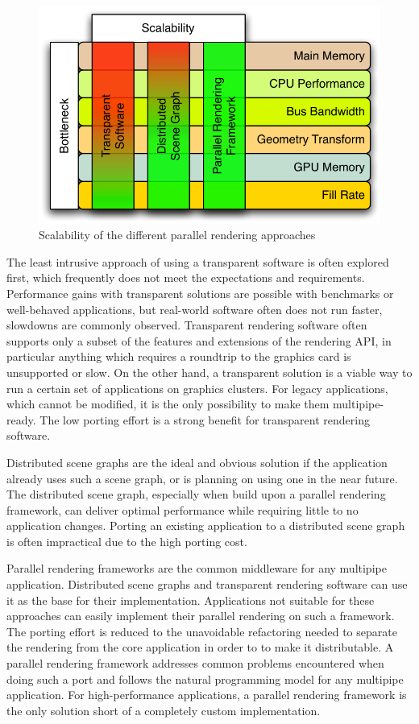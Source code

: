 \documentclass[10pt,a4paper]{scrartcl}
\begin{document}
\begin{figure}[ht]
\centering
\includegraphics[width=0.45\columnwidth]{images/parallelism.pdf}
\caption{Scalability of the different parallel rendering approaches}
\label{FIG_parallelism}
\end{figure}

The least intrusive approach of using a transparent software is often explored
first, which frequently does not meet the expectations and
requirements. Performance gains with transparent solutions are 
possible with benchmarks or well-behaved applications, but
real-world software often does not run faster, slowdowns are commonly
observed. Transparent rendering software often supports only a subset of
the features and extensions of the rendering API, in particular anything
which requires a roundtrip to the graphics card is unsupported or
slow. On the other hand, a transparent solution is a viable way to run a
certain set of applications on graphics clusters. For legacy
applications, which cannot be modified, it is the only possibility to make
them multipipe-ready. The low porting effort is a strong benefit for
transparent rendering software.

Distributed scene graphs are the ideal and obvious solution if the
application already uses such a scene graph, or is planning on using
one in the near future. The distributed scene graph, especially when
build upon a parallel rendering framework, can deliver optimal
performance while requiring little to no application changes. Porting an
existing application to a distributed scene graph is often impractical
due to the high porting cost.

Parallel rendering frameworks are the common middleware for any
multipipe application. Distributed scene graphs and transparent
rendering software can use it as the base for their
implementation. Applications not suitable for these approaches
can easily implement their parallel rendering on such a framework. The
porting effort is reduced to the unavoidable refactoring needed to
separate the rendering from the core application in order to to make it
distributable. A parallel rendering framework addresses common problems
encountered when doing such a port and follows the natural programming
model for any multipipe application. For high-performance applications,
a parallel rendering framework is the only solution short of a
completely custom implementation.
\end{document}
